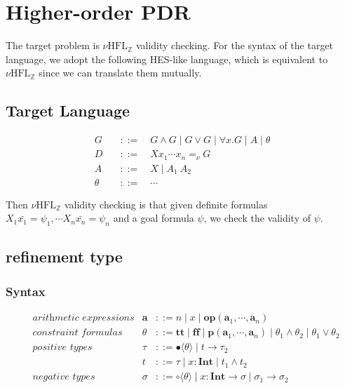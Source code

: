 \documentclass[runningheads]{llncs}
\newcommand \nhz{\(\nu\text{HFL}_\mathbb{Z}\)}
\newcommand \true {\textbf{tt}}
\newcommand \false {\textbf{ff}}
\newcommand \predicate {\textbf{p}}
\newcommand \arith {\textbf{a}}
\newcommand \operator {\mathbin{\textbf{op}}}
\newcommand \atom {A}
\newcommand \goal {G}
\newcommand \definite {D}
\newcommand \stypeint {\textbf{Int}}
\newcommand \stypebool {\bullet}
\newcommand \stypeboolf {\circ}
\newcommand \constraint {\theta}
\newcommand \refty {\tau}
\newcommand \typeint[1]{{#1} : \stypeint}
\newcommand \typebool[1]{\stypebool \langle #1 \rangle}
\newcommand \typeboolf[1]{\stypeboolf \langle #1 \rangle}
\newcommand {\intersect} {\land}
\begin{document}
\section{Higher-order PDR}

The target problem is \nhz{} validity checking.
For the syntax of the target language, we adopt the following HES-like language,
which is equivalent to \nhz{} since we can translate them mutually.

\subsection{Target Language}

\begin{align*}
    \goal &\quad ::= \quad
          G \land G
          \mid G \lor G
          \mid \forall x. G
          \mid \atom
          \mid \constraint
         \\
    \definite &\quad ::= \quad X x_1 \cdots x_n =_\nu G
          \\
    \atom &\quad ::= \quad X \mid A_1\ A_2\\
    \constraint &\quad ::= \quad \cdots
\end{align*}


Then \nhz{} validity checking is that given definite formulas
\( X_1 \bar{x_1} = \psi_1, \cdots X_n \bar{x_n} =  \psi_n \)
and a goal formula \( \psi \),
we check the validity of \( \psi \).

\subsection{refinement type}

\subsubsection{Syntax}

\begin{align*}
  &\textit{arithmetic expressions} &
  \arith &::=
  n
  \mid
  x
  \mid
  \operator(\arith_1, \cdots, \arith_n)
  \\
  &\textit{constraint formulas}&
  \constraint &::=
  \true
  \mid \false
  \mid \predicate(\arith_1, \cdots, \arith_n)
  \mid \constraint_1 \land \constraint_2
  \mid \constraint_1 \lor \constraint_2
  \\
  &\textit{positive types}&
  \refty &::=
  \typebool{\theta}
  \mid t \rightarrow \refty_2
  \\
  &&
  t &::=
  \tau
  \mid \typeint{x}
  \mid t_1 \land t_2
  \\
  &\textit{negative types}&
  \sigma &::=
  \typeboolf{\theta}
  \mid \typeint{x} \rightarrow \sigma
  \mid \sigma_1 \rightarrow \sigma_2
\end{align*}
\end{document}
